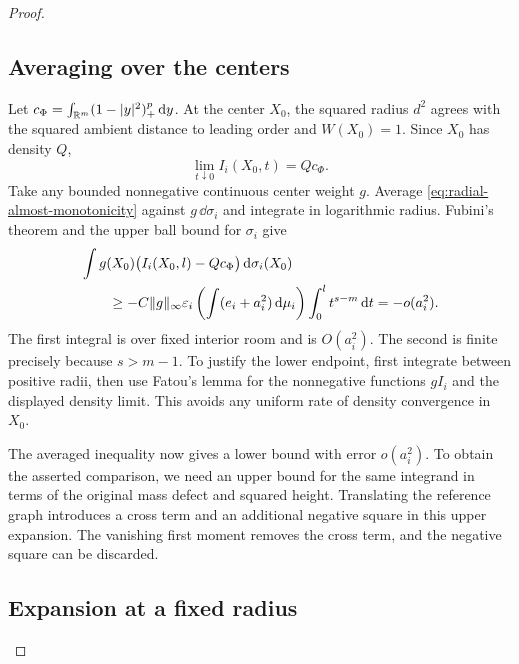 \begin{proof}
\subsection*{Averaging over the centers}

Let $c_\Phi=\int_{\mathbb R^m}(1-|y|^2)_+^p\,\mathrm d y$.
At the center $X_0$, the squared radius $d^2$ agrees with the squared
ambient distance to leading order and $W(X_0)=1$. Since $X_0$ has
density $Q$,
\[
                  \lim_{t\downarrow0}I_i(X_0,t)=Qc_\Phi.
\]
Take any bounded nonnegative continuous center weight $g$. Average
\eqref{eq:radial-almost-monotonicity} against $g\,\dd\sigma_i$ and
integrate in logarithmic radius. Fubini's theorem and the upper ball
bound for $\sigma_i$ give
\begin{align}
 &\int g(X_0)\bigl(I_i(X_0,l)-Qc_\Phi\bigr)\,\mathrm d\sigma_i(X_0)
 \notag\\
 &\hspace{2em}\ge
 -C\|g\|_\infty\varepsilon_i
    \left(\int(e_i+a_i^2)\,\mathrm d\mu_i\right)
                  \int_0^l t^{s-m}\,\mathrm d t
 =-o(a_i^2).\label{eq:averaged-density}
\end{align}
The first integral is over fixed interior room and is $O(a_i^2)$.
The second is finite precisely because $s>m-1$. To justify the lower
endpoint, first integrate between positive radii, then use Fatou's
lemma for the nonnegative functions $gI_i$ and the displayed density
limit. This avoids any uniform rate of density convergence in $X_0$.

The averaged inequality now gives a lower bound with error $o(a_i^2)$.
To obtain the asserted comparison, we need an upper bound for the same
integrand in terms of the original mass defect and squared height.
Translating the reference graph introduces a cross term and an additional
negative square in this upper expansion. The vanishing first moment
removes the cross term, and the negative square can be discarded.

\subsection*{Expansion at a fixed radius}


\end{proof}
